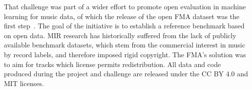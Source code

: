 \documentclass[sigconf]{acmart}
\begin{document}
That challenge was part of a wider effort to promote open evaluation in machine learning for music data, of which the release of the open FMA dataset was the first step~\cite{fma_dataset}. The goal of the initiative is to establish a reference benchmark based on open data. MIR research has historically suffered from the lack of publicly available benchmark datasets, which stem from the commercial interest in music by record labels, and therefore imposed rigid copyright. The FMA's solution was to aim for tracks which license permits redistribution. All data and code produced during the project and challenge are released under the CC BY 4.0 and MIT licenses.




\end{document}
